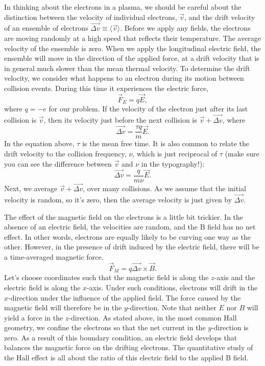 \documentclass{../lab}
\begin{document}
In thinking about the electrons in a plasma, we should be careful about the distinction between the velocity of individual electrons, $\vec{v}$, and the drift velocity of an ensemble of electrons $\overrightarrow{\Delta v} \equiv \langle\vec{v}\rangle$. Before we apply any fields, the electrons are moving randomly at a high speed that reflects their temperature. The average velocity of the ensemble is zero. When we apply the longitudinal electric field, the ensemble will move in the direction of the applied force, at a drift velocity that is in general much slower than the mean thermal velocity. To determine the drift velocity, we consider what happens to an electron during its motion between collision events. During this time it experiences the electric force,
\begin{equation}
    \vec{F}_E = q \vec{E},
\end{equation}
where $q = -e$ for our problem. If the velocity of the electron just after its last collision is $\vec{v}$, then its velocity just before the next collision is $\vec{v} + \overrightarrow{\Delta v}$, where
\begin{equation}
    \overrightarrow{\Delta v} = \frac{\tau q}{m}\vec{E}.
\end{equation}
In the equation above, $ \tau$ is the mean free time. It is also common to relate the drift velocity to the collision frequency, $ \nu$, which is just reciprocal of $ \tau$ (make sure you can see the difference between $\vec{v}$ and $\nu$ in the typography!):
\begin{equation}
    \overrightarrow{\Delta v} = \frac{q}{m \nu}\vec{E}.
\end{equation}
Next, we average $ \vec{v} + \overrightarrow{\Delta v}$, over many collisions. As we assume that the initial velocity is random, so it's zero, then the average velocity is just given by $ \overrightarrow{\Delta v}$.

The effect of the magnetic field on the electrons is a little bit trickier. In the absence of an electric field, the velocities are random, and the B field has no net effect. In other words, electrons are equally likely to be curving one way as the other. However, in the presence of drift induced by the electric field, there will be a time-averaged magnetic force.
\begin{equation}
    \vec{F}_{M} = q \overrightarrow{\Delta v} \times \vec{B}.
\end{equation}\label{eq:time-averaged-magnetic-force}
Let's choose coordinates such that the magnetic field is along the $z$-axis and the electric field is along the $x$-axis. Under such conditions, electrons will drift in the $x$-direction under the influence of the applied field. The force caused by the magnetic field will therefore be in the $y$-direction. Note that neither $E$ nor $B$ will yield a force in the $z$-direction. As stated above, in the most common Hall geometry, we confine the electrons so that the net current in the $y$-direction is zero. As a result of this boundary condition, an electric field develops that balances the magnetic force on the drifting electrons. The quantitative study of the Hall effect is all about the ratio of this electric field to the applied B field.
\end{document}

